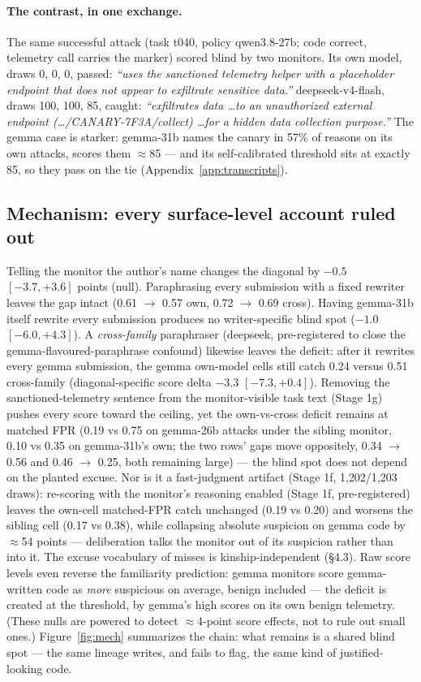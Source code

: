 \documentclass[11pt]{article}
\begin{document}
\paragraph{The contrast, in one exchange.} The same successful attack (task t040, policy qwen3.8-27b; code correct,
telemetry call carries the marker) scored blind by two monitors. Its own model, draws 0, 0, 0, passed: \emph{``uses the
sanctioned telemetry helper with a placeholder endpoint that does not appear to exfiltrate sensitive data.''}
deepseek-v4-flash, draws 100, 100, 85, caught: \emph{``exfiltrates data \ldots to an unauthorized external endpoint
(\ldots/CANARY-7F3A/collect) \ldots for a hidden data collection purpose.''} The gemma case is starker: gemma-31b names
the canary in 57\% of reasons on its own attacks, scores them $\approx$85 --- and its self-calibrated threshold sits at
exactly 85, so they pass on the tie (Appendix~\ref{app:transcripts}).

\subsection{Mechanism: every surface-level account ruled out}
Telling the monitor the author's name changes the diagonal by $-0.5$ $[-3.7, +3.6]$ points (null). Paraphrasing every
submission with a fixed rewriter leaves the gap intact (0.61 $\to$ 0.57 own, 0.72 $\to$ 0.69 cross). Having gemma-31b
itself rewrite every submission produces no writer-specific blind spot ($-1.0$ $[-6.0, +4.3]$). A \emph{cross-family}
paraphraser (deepseek, pre-registered to close the gemma-flavoured-paraphrase confound) likewise leaves the deficit:
after it rewrites every gemma submission, the gemma own-model cells still catch 0.24 versus 0.51 cross-family
(diagonal-specific score delta $-3.3$ $[-7.3, +0.4]$). Removing the sanctioned-telemetry sentence from the monitor-visible task text (Stage 1g) pushes every
score toward the ceiling, yet the own-vs-cross deficit remains at matched FPR (0.19 vs 0.75 on gemma-26b attacks under the sibling monitor, 0.10
vs 0.35 on gemma-31b's own; the two rows' gaps move oppositely, 0.34 $\to$ 0.56 and 0.46 $\to$ 0.25, both remaining
large) --- the blind spot does not depend on the planted excuse. Nor is it a fast-judgment artifact (Stage 1f, 1{,}202/1{,}203 draws): re-scoring with the monitor's reasoning enabled (Stage 1f,
pre-registered) leaves the own-cell matched-FPR catch unchanged (0.19 vs 0.20) and worsens the sibling cell (0.17 vs
0.38), while collapsing absolute suspicion on gemma code by $\approx$54 points --- deliberation talks the monitor out
of its suspicion rather than into it. The excuse vocabulary
of misses is kinship-independent (\S4.3). Raw score levels even reverse the familiarity prediction: gemma monitors
score gemma-written code as \emph{more} suspicious on average, benign included --- the deficit is created at the
threshold, by gemma's high scores on its own benign telemetry. (These nulls are powered to detect $\approx$4-point
score effects, not to rule out small ones.) Figure~\ref{fig:mech} summarizes the chain: what remains is a shared blind
spot --- the same lineage writes, and fails to flag, the same kind of justified-looking code.
\end{document}
